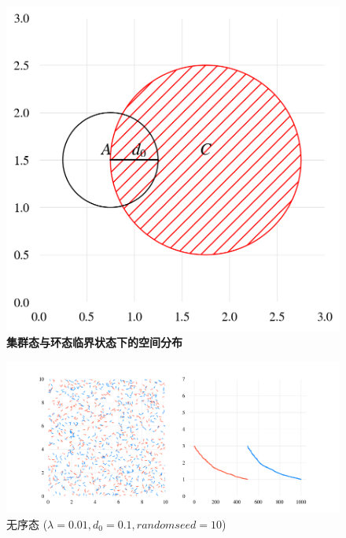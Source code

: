 \documentclass{article}
\begin{document}
\begin{figure}[H]
	\centering
	\includegraphics[width=\textwidth]{./figs/circleSwarmEdges2.png}
	\vspace{-1cm}
	\caption{\small \textbf{集群态与环态临界状态下的空间分布}}
	\label{fig:fig23.2}
\end{figure}

\newpage
\begin{figure}[H]
	\centering
	\includegraphics[width=\textwidth]{./figs/CorrectCoupling_uniform_0.010_0.10_10_radius.png}
	\vspace{-1cm}
	\caption{无序态 ($\lambda=0.01, d_0=0.1, random seed=10$)}
	\label{fig:fig22.1}
\end{figure}

\vspace{-1cm}
\end{document}
